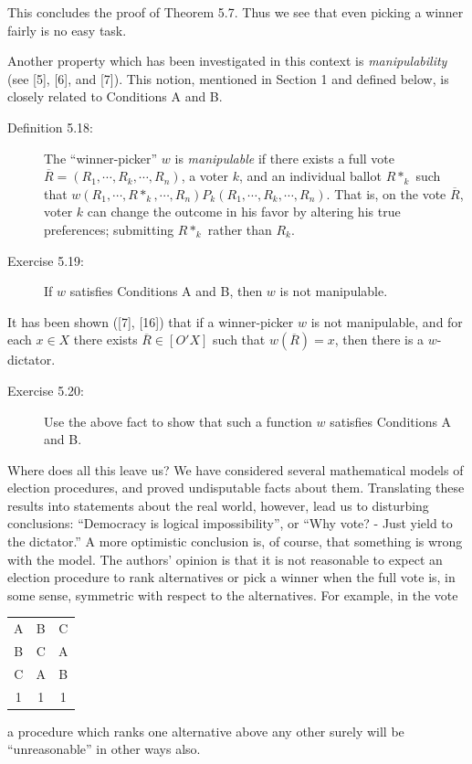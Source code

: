 \documentclass{article}
\begin{document}
This concludes the proof of Theorem 5.7. Thus we see that even picking a winner fairly is no easy task.

\vspace{0.3cm}

Another property which has been investigated in this context is \emph{manipulability} (see [5], [6], and [7]). This notion, mentioned in Section 1 and defined below, is closely related to Conditions A and B.

\begin{description}

\item[Definition 5.18:] The ``winner-picker'' $w$ is \emph{manipulable} if there exists a full vote $\overline{R} = (R_{1},\cdots,R_{k},\cdots,R_{n})$, a voter $k$, and an individual ballot $R*_{k}$ such that $w(R_{1},\cdots,R*_{k},\cdots,R_{n}) P_{k} (R_{1},\cdots,R_{k},\cdots,R_{n})$. That is, on the vote $\overline{R}$, voter $k$ can change the outcome in his favor by altering his true preferences; submitting $R*_{k}$ rather than $R_{k}$.

\item[Exercise 5.19:] If $w$ satisfies Conditions A and B, then $w$ is not manipulable.

\end{description}

It has been shown ([7], [16]) that if a winner-picker $w$ is not manipulable, and for each $x \in X$ there exists $\overline{R} \in [O'X]$ such that $w(\overline{R}) = x$, then there is a $w$-dictator.

\begin{description}

\item[Exercise 5.20:] Use the above fact to show that such a function $w$ satisfies Conditions A and B.

\end{description}

Where does all this leave us? We have considered several mathematical models of election procedures, and proved undisputable facts about them. Translating these results into statements about the real world, however, lead us to disturbing conclusions: ``Democracy is logical impossibility'', or ``Why vote? - Just yield to the dictator.'' A more optimistic conclusion is, of course, that something is wrong with the model. The authors' opinion is that it is not reasonable to expect an election procedure to rank alternatives or pick a winner when the full vote is, in some sense, symmetric with respect to the alternatives. For example, in the vote
\begin{center}
\begin{tabular}{c|c|c}
  A & B & C \\
  B & C & A \\
  C & A & B \\
  \hline
  1 & 1 & 1 \\
\end{tabular}
\end{center}
a procedure which ranks one alternative above any other surely will be ``unreasonable'' in other ways also.
\end{document}

